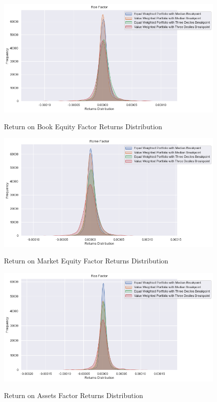 \begin{figure}[H]
	\caption{Return on Book Equity Factor Returns Distribution}
	\centering
	\includegraphics[scale=.63]{../../output/figures/roe.png}
	\label{fig:roe}
\end{figure}

\begin{figure}[H]
	\caption{Return on Market Equity Factor Returns Distribution}
	\centering
	\includegraphics[scale=.63]{../../output/figures/rome.png}
	\label{fig:rome}
\end{figure}

\begin{figure}[H]
	\caption{Return on Assets Factor Returns Distribution}
	\centering
	\includegraphics[scale=.63]{../../output/figures/roa.png}
	\label{fig:roa}
\end{figure}

